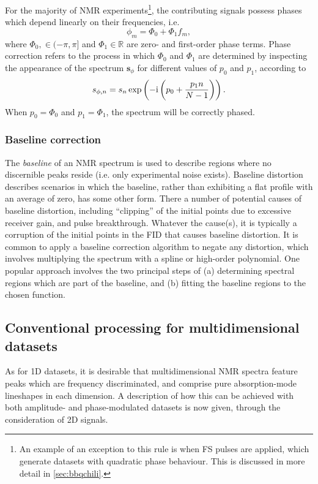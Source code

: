 For the majority of \ac{NMR} experiments\footnote{
     An example of an exception to this rule is when \acl{FS} pulses are applied,
     which generate datasets with quadratic phase behaviour. This is discussed
     in more detail in \cref{sec:bbqchili}.
}, the contributing signals possess phases which depend linearly on their
frequencies, i.e.
\begin{equation}
    \phi_m = \Phi_0 + \Phi_1 f_m,
\end{equation}
where $\Phi_0, \in (-\pi, \pi]$ and $\Phi_1 \in \mathbb{R}$ are zero- and
first-order phase terms.
Phase correction refers to the process in which $\Phi_0$ and $\Phi_1$ are
determined by inspecting the appearance of the spectrum
$\symbf{s}_{\phi}$ for different values of $p_0$ and  $p_1$, according to
\begin{equation}
    s_{\phi,n} = s_n
    \exp\left(-\mathrm{i} \left(p_0 + \frac{p_1 n}{N - 1}\right)\right).
\end{equation}
When $p_0 = \Phi_0$ and  $p_1 = \Phi_1$, the spectrum will be correctly phased.

\subsubsection{Baseline correction}
The \emph{baseline} of an \ac{NMR} spectrum is used to describe regions where
no discernible peaks reside (i.e. only experimental noise exists).
Baseline distortion describes scenarios in which the baseline, rather
than exhibiting a flat profile with an average of zero, has some other form.
There a number of potential causes of baseline distortion, including
``clipping'' of the initial points due to excessive receiver gain,
and pulse breakthrough.
Whatever the cause(s), it is typically a corruption of the initial points in
the \ac{FID} that causes baseline distortion.
It is common to apply a baseline correction algorithm to negate any distortion,
which involves multiplying the spectrum with a spline or high-order polynomial.
One popular approach involves the two principal steps of (a) determining
spectral regions which are part of the baseline, and (b) fitting the baseline
regions to the chosen function\cite{Dietrich1991,Cobas2006}.

\subsection{Conventional processing for multidimensional datasets}
\label{subsec:mulitdim}
As for \ac{1D} datasets, it is desirable that multidimensional \ac{NMR} spectra
feature peaks which are frequency discriminated, and comprise pure
absorption-mode lineshapes in each dimension.
A description of how this can be achieved with both amplitude- and
phase-modulated datasets is now given, through the consideration of \ac{2D}
signals.

